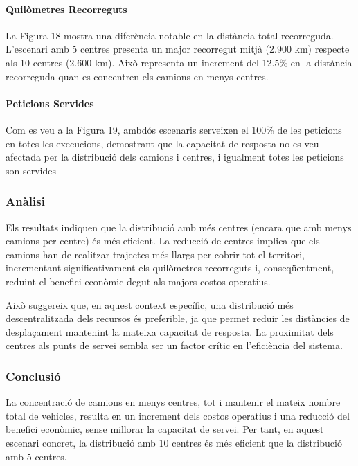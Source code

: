 \paragraph{Quilòmetres Recorreguts}

La Figura 18 mostra una diferència notable en la distància total recorreguda. L'escenari amb 5 centres presenta un major recorregut mitjà (2.900 km) respecte als 10 centres (2.600 km). Això representa un increment del 12.5\% en la distància recorreguda quan es concentren els camions en menys centres.


\paragraph{Peticions Servides}
Com es veu a la Figura 19, ambdós escenaris serveixen el 100\% de les peticions en totes les execucions, demostrant que la capacitat de resposta no es veu afectada per la distribució dels camions i centres, i igualment totes les peticions son servides


\subsubsection{Anàlisi}
Els resultats indiquen que la distribució amb més centres (encara que amb menys camions per centre) és més eficient. La reducció de centres implica que els camions han de realitzar trajectes més llargs per cobrir tot el territori, incrementant significativament els quilòmetres recorreguts i, conseqüentment, reduint el benefici econòmic degut als majors costos operatius.

Això suggereix que, en aquest context específic, una distribució més descentralitzada dels recursos és preferible, ja que permet reduir les distàncies de desplaçament mantenint la mateixa capacitat de resposta. La proximitat dels centres als punts de servei sembla ser un factor crític en l'eficiència del sistema.

\subsubsection{Conclusió}
La concentració de camions en menys centres, tot i mantenir el mateix nombre total de vehicles, resulta en un increment dels costos operatius i una reducció del benefici econòmic, sense millorar la capacitat de servei. Per tant, en aquest escenari concret, la distribució amb 10 centres és més eficient que la distribució amb 5 centres.

